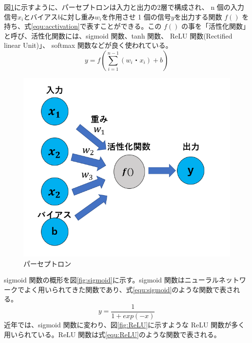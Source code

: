 図\ref{fig:perce}に示すように、パーセプトロンは入力と出力の2層で構成され、 n 個の入力信号$x_i$とバイアス$b$に対し重み$w_i$を作用させ 1 個の信号$y$を出力する関数 $f( )$ を持ち、式\ref{equ:acctivation}で表すことができる。この $f( )$ の事を「活性化関数」と呼び、活性化関数には、sigmoid 関数、tanh 関数、 ReLU 関数(Rectified linear Unit)」、 softmax 関数などが良く使われている。 
\begin{equation}
    y = f(\sum^{n-1}_{i=1}(w_i・x_i) + b)
    \label{equ:acctivation}
\end{equation}
\begin{figure}[tb]
  \centering
  \includegraphics[clip, width=13cm]{fig/4/parceptron.png}
  \caption{パーセプトロン}
  \label{fig:perce}
\end{figure}
sigmoid 関数の概形を図\ref{fig:sigmoid}に示す。sigmoid 関数はニューラルネットワークでよく用いられてきた関数であり、式\ref{equ:sigmoid}のような関数で表される。
\begin{equation}
    y = \frac{1}{1+exp(-x)}
    \label{equ:sigmoid}
\end{equation}
近年では、sigmoid 関数に変わり、図\ref{fig:ReLU}に示すような ReLU 関数が多く用いられている。ReLU 関数は式\ref{equ:ReLU}のような関数で表される。
